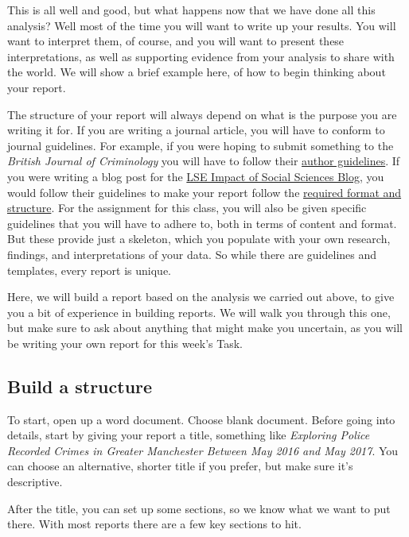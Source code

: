 \documentclass[
]{book}
\begin{document}
This is all well and good, but what happens now that we have done all this analysis? Well most of the time you will want to write up your results. You will want to interpret them, of course, and you will want to present these interpretations, as well as supporting evidence from your analysis to share with the world. We will show a brief example here, of how to begin thinking about your report.

The structure of your report will always depend on what is the purpose you are writing it for. If you are writing a journal article, you will have to conform to journal guidelines. For example, if you were hoping to submit something to the \emph{British Journal of Criminology} you will have to follow their \href{https://academic.oup.com/bjc/pages/General_Instructions}{author guidelines}. If you were writing a blog post for the \href{https://blogs.lse.ac.uk/impactofsocialsciences/}{LSE Impact of Social Sciences Blog}, you would follow their guidelines to make your report follow the \href{https://blogs.lse.ac.uk/impactofsocialsciences/write-for-us/}{required format and structure}. For the assignment for this class, you will also be given specific guidelines that you will have to adhere to, both in terms of content and format. But these provide just a skeleton, which you populate with your own research, findings, and interpretations of your data. So while there are guidelines and templates, every report is unique.

Here, we will build a report based on the analysis we carried out above, to give you a bit of experience in building reports. We will walk you through this one, but make sure to ask about anything that might make you uncertain, as you will be writing your own report for this week's Task.

\hypertarget{build-a-structure}{%
\subsection{Build a structure}\label{build-a-structure}}

To start, open up a word document. Choose blank document. Before going into details, start by giving your report a title, something like \emph{Exploring Police Recorded Crimes in Greater Manchester Between May 2016 and May 2017}. You can choose an alternative, shorter title if you prefer, but make sure it's descriptive.

After the title, you can set up some sections, so we know what we want to put there. With most reports there are a few key sections to hit.
\end{document}
